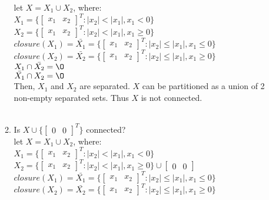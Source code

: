 \documentclass[12pt,letter]{article}
\begin{document}
\begin{itemize}
\begin{enumerate}
  let $X=X_1\cup X_2$, where:\\
  $X_1 = \{ \begin{bmatrix}x_1 & x_2\end{bmatrix}^T: |x_2|<|x_1|, x_1<0\}$\\
  $X_2 = \{ \begin{bmatrix}x_1 & x_2\end{bmatrix}^T: |x_2|<|x_1|, x_1\geq 0\}$\\

  $closure(X_1) = \bar{X_1}= \{ \begin{bmatrix}x_1 & x_2\end{bmatrix}^T: |x_2|\leq|x_1|, x_1\leq0\}$\\
  $closure(X_2) = \bar{X_2}= \{ \begin{bmatrix}x_1 & x_2\end{bmatrix}^T: |x_2|\leq|x_1|, x_1\geq0\}$\\

  $X_1 \cap \bar{X_2} = \O$\\
  $\bar{X_1} \cap X_2 = \O$\\

  Then, $X_1$ and $X_2$ are separated. $X$ can be partitioned as a union of 2 non-empty separated sets. Thus $X$ is not connected.\\
  
  \\
  
\item
  
  Is $X\cup\{\begin{bmatrix}0 & 0\end{bmatrix}^T\}$ connected?\\

  let $X=X_1\cup X_2$, where:\\
  $X_1 = \{ \begin{bmatrix}x_1 & x_2\end{bmatrix}^T: |x_2|<|x_1|, x_1<0\}$\\
  $X_2 = \{ \begin{bmatrix}x_1 & x_2\end{bmatrix}^T: |x_2|<|x_1|, x_1\geq 0\} \cup \begin{bmatrix}0 & 0\end{bmatrix}$\\

  $closure(X_1) = \bar{X_1}= \{ \begin{bmatrix}x_1 & x_2\end{bmatrix}^T: |x_2|\leq|x_1|, x_1\leq0\}$\\
  $closure(X_2) = \bar{X_2}= \{ \begin{bmatrix}x_1 & x_2\end{bmatrix}^T: |x_2|\leq|x_1|, x_1\geq0\}$\\ 


\end{enumerate}
\end{itemize}
\end{document}
